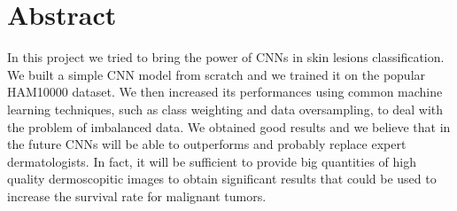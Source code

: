 \chapter*{Abstract}

In this project we tried to bring the power of CNNs in skin lesions classification. We built a simple CNN model from scratch and we trained it on the popular HAM10000\cite{article4} dataset. We then increased its performances using common machine learning techniques, such as class weighting and data oversampling, to deal with the problem of imbalanced data. We obtained good results and we believe that in the future CNNs will be able to outperforms and probably replace expert dermatologists. In fact, it will be sufficient to provide big quantities of high quality dermoscopitic images to obtain significant results that could be used to increase the survival rate for malignant tumors.

